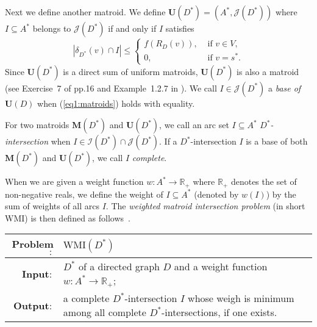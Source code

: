 \documentclass[11pt]{article}
\newcounter{ni}
\theoremstyle{plain}
\begin{document}
Next we define another matroid. We define $\bm{U}(D^{\ast})=(A^{\ast},\mathcal{J}(D^{\ast}))$ 
where $I\subseteq A^{\ast}$ 
belongs to $\mathcal{J}(D^{\ast})$ if and only if $I$ satisfies 
\begin{equation} \label{eq1:matroids}
|\delta_{D^{\ast}}(v)\cap I| \le 
\left\{
\begin{array}{ll}
f(R_D(v)), & \mbox{ if } v \in V, \\
0, & \mbox{ if } v=s^{\ast}.  
\end{array}
\right.
\end{equation}
Since $\bm{U}(D^{\ast})$ is a direct sum of uniform matroids,  
$\bm{U}(D^{\ast})$ is also a matroid (see Exercise~7 of pp.16 and Example~1.2.7 in \cite{O92}). 
We call $I \in \mathcal{J}(D^{\ast})$ a {\it base of $\bm{U}(D)$} 
when (\ref{eq1:matroids}) holds with equality. 

For two matroids $\bm{M}(D^{\ast})$ and $\bm{U}(D^{\ast})$, 
we call an arc set $I \subseteq A^{\ast}$
{\it $D^{\ast}$-intersection} when $I \in \mathcal{I}(D^{\ast})\cap \mathcal{J}(D^{\ast})$. 
If a $D^{\ast}$-intersection $I$ is a base of both $\bm{M}(D^{\ast})$ and $\bm{U}(D^{\ast})$, 
we call $I$ {\it complete}. 

When we are given a weight function $w \colon A^{\ast}\to \mathbb{R}_+$ where $\mathbb{R}_+$ 
denotes the set of non-negative reals, 
we define the weight of $I\subseteq A^{\ast}$ (denoted by $w(I)$) 
by the sum of weights of all arcs $I$. 
The {\it weighted matroid intersection problem} (in short $\mbox{WMI}$) is then defined as follows~\cite{F81}. 
\begin{center}
\begin{tabularx}{150mm}{rX}
\hline
{\bf Problem$\colon$} & $\mbox{WMI}(D^{\ast})$ 
\\
\hline 
{\bf Input$\colon$} &
$D^{\ast}$ of a directed graph  $D$ 
and a weight function $w\colon A^{\ast}\to \mathbb{R}_+$;
\\
{\bf Output$\colon$} &
a complete $D^{\ast}$-intersection $I$ whose weigh is minimum among all complete 
$D^{\ast}$-intersections, if one exists.
\\
\hline
\end{tabularx}
\end{center}
\end{document}
